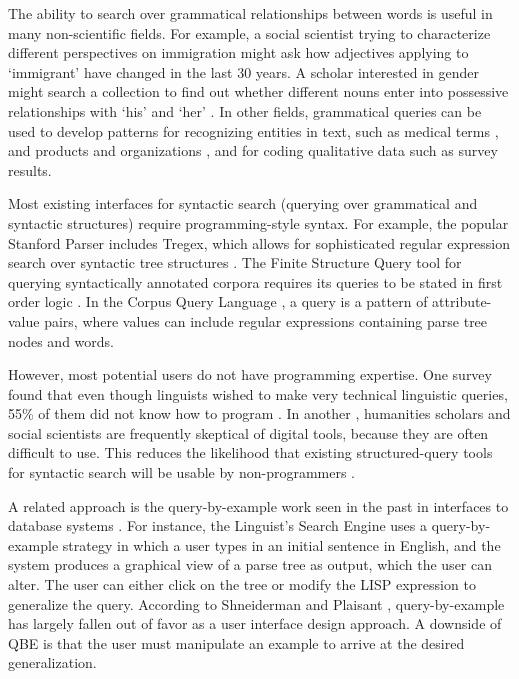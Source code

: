 The ability to search over grammatical relationships between words is useful in many non-scientific fields. For example, a social scientist trying to characterize different perspectives on immigration might ask how adjectives applying to `immigrant' have changed in the last 30 years. A scholar interested in gender might search a collection to find out whether different nouns enter into possessive relationships with `his' and `her' \cite{muralidharan2013supporting}. In other fields, grammatical queries can be used to develop patterns for recognizing entities in text, such as medical terms \cite{hirschman2005overview,maclean2013identifying}, and  products and organizations \cite{culotta2005reducing}, and for coding qualitative data such as survey results.

Most existing interfaces for syntactic search (querying over grammatical and syntactic structures) require  programming-style syntax. For example, the popular Stanford Parser includes Tregex, which allows for sophisticated regular expression search over syntactic tree structures \cite{levy2006tregex}.
The Finite Structure Query tool for querying syntactically annotated corpora requires its queries to be stated in first order logic \cite{kepser2003finite}. In the Corpus Query Language \cite{jakubicek2010fast}, a query is a pattern of attribute-value pairs, where values can include regular expressions containing parse tree nodes and words.

However, most potential users do not have programming expertise. One survey found that even though linguists wished to make very technical  linguistic queries, 55\% of them did not know how to program \cite{soehn2008requirements}. In another \cite{gibbs_building_2012}, humanities scholars and social scientists are frequently skeptical of digital tools, because they are often difficult to use. This reduces the likelihood that existing structured-query tools for syntactic search will be usable by non-programmers \cite{ogden1983query}.

A related approach is the query-by-example work seen in the past in interfaces to database systems \cite{androutsopoulos1995natural}. For instance, the Linguist's Search Engine \cite{resnik2005web} uses a query-by-example strategy in which a user types in an initial sentence in English, and the system produces a graphical view of a parse tree as output, which the user can alter. 
The user can either click on the tree or modify the LISP expression to generalize the query. 
According to Shneiderman and Plaisant \cite{shneiderman2010designing}, query-by-example has largely fallen out of favor as a user interface design approach. A downside of QBE is that the user must manipulate an example to arrive at the desired generalization.

